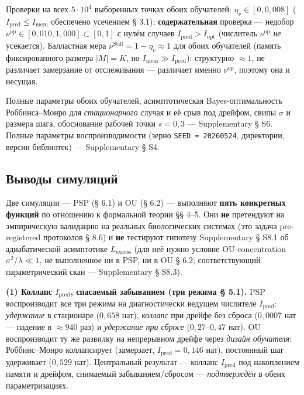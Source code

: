 \documentclass[pdflatex,sn-mathphys-ay]{sn-jnl}
\begin{document}
Проверки на всех \(5 \cdot 10^4\) выборенных точках обоих обучателей: \(\eta_v \in [0, 0{,}008]\) (\(I_{\text{pred}} \le I_{\text{mem}}\) обеспечено усечением § 3.1); \textbf{содержательная} проверка --- недобор \(\nu^{\text{op}} \in [0{,}010, 1{,}000] \subset [0,1]\) с нулём случаев \(I_{\text{pred}} > I_{\text{opt}}\) (числитель \(\nu^{\text{op}}\) \emph{не} усекается). Балластная мера \(\nu^{\text{Still}} = 1 - \eta_v \approx 1\) для обоих обучателей (память фиксированного размера \(|M| = K\), но \(I_{\text{mem}} \gg I_{\text{pred}}\)): структурно \(\approx 1\), не различает замерзание от отслеживания --- различает именно \(\nu^{\text{op}}\), поэтому она и несущая.



Полные параметры обоих обучателей, асимптотическая Bayes-оптимальность Роббинса--Монро для \emph{стационарного} случая и её срыв под дрейфом, свипы \(\sigma\) и размера шага, обоснование рабочей точки \(s = 0{,}3\) --- Supplementary § S6. Полные параметры воспроизводимости (зерно \texttt{SEED\ =\ 20260524}, директории, версии библиотек) --- Supplementary § S4.



\subsection{Выводы симуляций}\label{ux432ux44bux432ux43eux434ux44b-ux441ux438ux43cux443ux43bux44fux446ux438ux439}



Две симуляции --- PSP (§ 6.1) и OU (§ 6.2) --- выполняют \textbf{пять конкретных функций} по отношению к формальной теории §§ 4--5. Они \textbf{не} претендуют на эмпирическую валидацию на реальных биологических системах (это задача pre-registered протоколов § 8.6) и \textbf{не} тестируют гипотезу Supplementary § S8.1 об адиабатической асимптотике \(L_{\text{excess}}\) (для неё нужно условие OU-concentration \(\sigma^2/\lambda \ll 1\), не выполненное ни в PSP, ни в OU § 6.2; соответствующий параметрический скан --- Supplementary § S8.3).



\textbf{(1) Коллапс \(I_{\text{pred}}\), спасаемый забыванием (три режима § 5.1).} PSP воспроизводит все три режима на диагностически ведущем числителе \(I_{\text{pred}}\): \emph{удержание} в стационаре (\(0{,}658\) нат), \emph{коллапс} при дрейфе без сброса (\(0{,}0007\) нат --- падение в \(\approx 940\) раз) и \emph{удержание при сбросе} (\(0{,}27\)--\(0{,}47\) нат). OU воспроизводит ту же развилку на непрерывном дрейфе через \emph{дизайн обучателя}: Роббинс--Монро коллапсирует (замерзает, \(I_{\text{pred}} = 0{,}146\) нат), постоянный шаг удерживает (\(0{,}529\) нат). Центральный результат --- коллапс \(I_{\text{pred}}\) под накоплением памяти и дрейфом, снимаемый забыванием/сбросом --- \emph{подтверждён} в обеих параметризациях.
\end{document}
